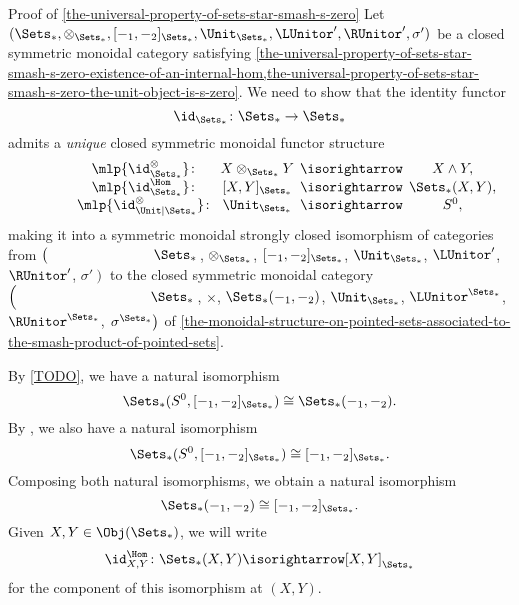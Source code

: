 \begin{Proof}{Proof of \cref{the-universal-property-of-sets-star-smash-s-zero}}%
    Let $(\Sets_{*},\otimes_{\Sets_{*}},[-_{1},-_{2}]_{\Sets_{*}},\Unit_{\Sets_{*}},\LUnitor',\RUnitor',\sigma')$ be a closed symmetric monoidal category satisfying \cref{the-universal-property-of-sets-star-smash-s-zero-existence-of-an-internal-hom,the-universal-property-of-sets-star-smash-s-zero-the-unit-object-is-s-zero}. We need to show that the identity functor
    \[
        \id_{\Sets_{*}}%
        \colon%
        \Sets_{*}%
        \to%
        \Sets_{*}%
    \]%
    admits a \emph{unique} closed symmetric monoidal functor structure
    \[%
        \begin{array}{cccc}
            \phantom{\id^{\otimes}_{\Sets_{*}}}\mlp{\id^{\otimes}_{\Sets_{*}}}       \colon\mkern-10mu & X\otimes_{\Sets_{*}}Y \mkern-10mu&{}\mathbin{\isorightarrow}&\mkern-10mu{}X\wedge Y,\\
            \phantom{\id^{\otimes}_{\Sets_{*}}}\mlp{\id^{\Hom}_{\Sets_{*}}}          \colon\mkern-10mu & [X,Y]_{\Sets_{*}}     \mkern-10mu&{}\mathbin{\isorightarrow}&\mkern-10mu{}\Sets_{*}(X,Y),\\
            \phantom{\id^{\otimes}_{\Sets_{*}}}\mlp{\id^{\otimes}_{\Unit|\Sets_{*}}} \colon\mkern-10mu & \Unit_{\Sets_{*}}     \mkern-10mu&{}\mathbin{\isorightarrow}&\mkern-10mu{}S^{0},
        \end{array}
    \]%
    making it into a symmetric monoidal strongly closed isomorphism of categories from $\left(\phantom{\mrp{\LUnitor'}}\Sets_{*}\right.$, $\otimes_{\Sets_{*}}$, $[-_{1},-_{2}]_{\Sets_{*}}$, $\Unit_{\Sets_{*}}$, $\LUnitor'$, $\RUnitor'$, $\left.\sigma'\right)$ to the closed symmetric monoidal category $\left(\phantom{\mrp{\LUnitor^{\Sets_{*}}}}\Sets_{*}\right.$, $\times$, $\Sets_{*}(-_{1},-_{2})$, $\Unit_{\Sets_{*}}$, $\LUnitor^{\Sets_{*}}$, $\RUnitor^{\Sets_{*}}$, $\left.\sigma^{\Sets_{*}}\right)$ of \cref{the-monoidal-structure-on-pointed-sets-associated-to-the-smash-product-of-pointed-sets}.

    By \cref{TODO}, we have a natural isomorphism
    \[
        \Sets_{*}(S^{0},[-_{1},-_{2}]_{\Sets_{*}})%
        \cong%
        \Sets_{*}(-_{1},-_{2}).%
    \]%
    By , we also have a natural isomorphism
    \[
        \Sets_{*}(S^{0},[-_{1},-_{2}]_{\Sets_{*}})%
        \cong%
        [-_{1},-_{2}]_{\Sets_{*}}.%
    \]%
    Composing both natural isomorphisms, we obtain a natural isomorphism
    \[
        \Sets_{*}(-_{1},-_{2})%
        \cong%
        [-_{1},-_{2}]_{\Sets_{*}}.%
    \]%
    Given $X,Y\in\Obj(\Sets_{*})$, we will write
    \[
        \id^{\Hom}_{X,Y}%
        \colon%
        \Sets_{*}(X,Y)%
        \isorightarrow%
        [X,Y]_{\Sets_{*}}%
    \]%
    for the component of this isomorphism at $(X,Y)$.


\end{Proof}
